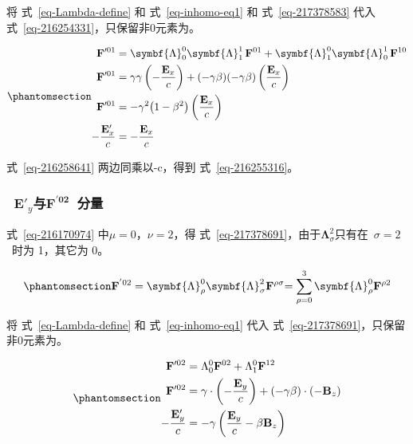 \documentclass[
  chinese,
  a4paper,
  UTF8,
  12pt,
  oneside,
  openany]{ctexbook}
\begin{document}
将 式~\ref{eq-Lambda-define} 和 式~\ref{eq-inhomo-eq1} 和
式~\ref{eq-217378583} 代入 式~\ref{eq-216254331}，只保留非0元素为。

\begin{equation}\protect\phantomsection\label{eq-216258641}{
\begin{aligned}
\mathbf{F}'^{01}
&= \symbf{\Lambda}_{0}^{0}\symbf{\Lambda}_{1}^{1}\,\mathbf{F}^{01}
+ \symbf{\Lambda}_{1}^{0}\symbf{\Lambda}_{0}^{1}\,\mathbf{F}^{10} \\
\mathbf{F}'^{01}
&= \gamma\gamma\left(-\frac{\mathbf{E}_{x}}{c}\right)
+ (-\gamma\beta)(-\gamma\beta)\left(\frac{\mathbf{E}_{x}}{c}\right) \\
\mathbf{F}'^{01}
&= -\gamma^{2}\bigl(1-\beta^{2}\bigr)\left(\frac{\mathbf{E}_{x}}{c}\right) \\
-\frac{\mathbf{E}'_{x}}{c}
&= -\frac{\mathbf{E}_{x}}{c}
\end{aligned}
}\end{equation}

式~\ref{eq-216258641} 两边同乘以-c，得到 式~\ref{eq-216255316}。

\subsubsection{\texorpdfstring{~\({\mathbf{E}'}_{y}\)与\(\mathbf{F}^{\mathbf{'02}}\)~分量}{~\{\textbackslash mathbf\{E\}\textquotesingle\}\_\{y\}与\textbackslash mathbf\{F\}\^{}\{\textbackslash mathbf\{\}\}~分量}}\label{mathbfe_yux4e0emathbffmathbf02-ux5206ux91cf}

式~\ref{eq-216170974} 中\(\mu = 0\)，\(\nu = 2\)，得
式~\ref{eq-217378691}，由于\(\symbf{\Lambda}_{\sigma}^{2}\)只有在~\(\sigma = 2\)~时为
1，其它为 0。

\begin{equation}\protect\phantomsection\label{eq-217378691}{
{\mathbf{F}^{'02} = \symbf{\Lambda}_{\rho}^{0}\symbf{\Lambda}_{\sigma}^{2}\mathbf{F}^{\rho\sigma}
  }{= \sum_{\rho = 0}^{3}{\symbf{\Lambda}_{\rho}^{0}\mathbf{F}^{\rho 2}}}
}\end{equation}

将 式~\ref{eq-Lambda-define} 和 式~\ref{eq-inhomo-eq1} 代入
式~\ref{eq-217378691}，只保留非0元素为。

\begin{equation}\protect\phantomsection\label{eq-216258166}{
\begin{aligned}
\mathbf{F}'^{02} &= \Lambda_{0}^{0} \mathbf{F}^{02} + \Lambda_{1}^{0} \mathbf{F}^{12} \\
\mathbf{F}'^{02} &= \gamma \cdot \left( - \frac{\mathbf{E}_y}{c} \right) + (-\gamma\beta) \cdot ( - \mathbf{B}_z ) \\
- \frac{\mathbf{E}'_y}{c} &= - \gamma \left( \frac{\mathbf{E}_y}{c} - \beta \mathbf{B}_z \right)
\end{aligned}
}\end{equation}
\end{document}

